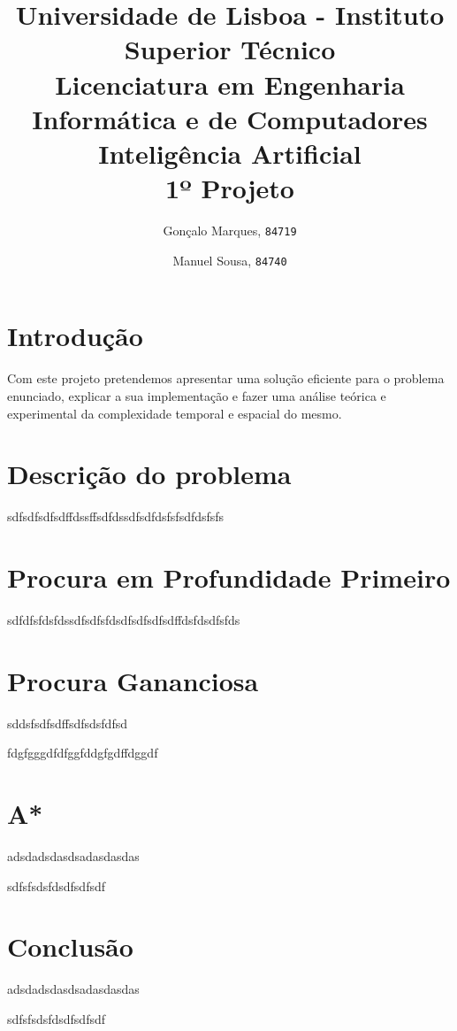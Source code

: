 \documentclass{scrartcl}
\begin{document}

\title{
	\textnormal{
	\LARGE Universidade de Lisboa - Instituto Superior Técnico\\
	\Large Licenciatura em Engenharia Informática e de Computadores\\
	\Large Inteligência Artificial
\\}
	\LARGE1º Projeto
	\vspace{-1ex}
	}
\author{Gonçalo Marques,
	\texttt{84719}
	\and
	Manuel Sousa,
	\texttt{84740}
}
\date{	\vspace{-1ex}
		\vspace{-4ex}
	}
\maketitle

\section*{Introdução}
Com este projeto pretendemos apresentar uma solução eficiente para o problema enunciado, explicar a sua implementação e fazer uma análise teórica e experimental da complexidade temporal e espacial do mesmo.

\section*{Descrição do problema}
sdfsdfsdfsdffdssffsdfdssdfsdfdsfsfsdfdsfsfs\par

\section*{Procura em Profundidade Primeiro}
sdfdfsfdsfdssdfsdfsfdsdfsdfsdfsdffdsfdsdfsfds\par

\section*{Procura Gananciosa}
sddsfsdfsdffsdfsdsfdfsd\par

fdgfgggdfdfggfddgfgdffdggdf

\section*{A*}
adsdadsdasdsadasdasdas

sdfsfsdsfdsdfsdfsdf

\section*{Conclusão}
adsdadsdasdsadasdasdas

sdfsfsdsfdsdfsdfsdf
\end{document}
